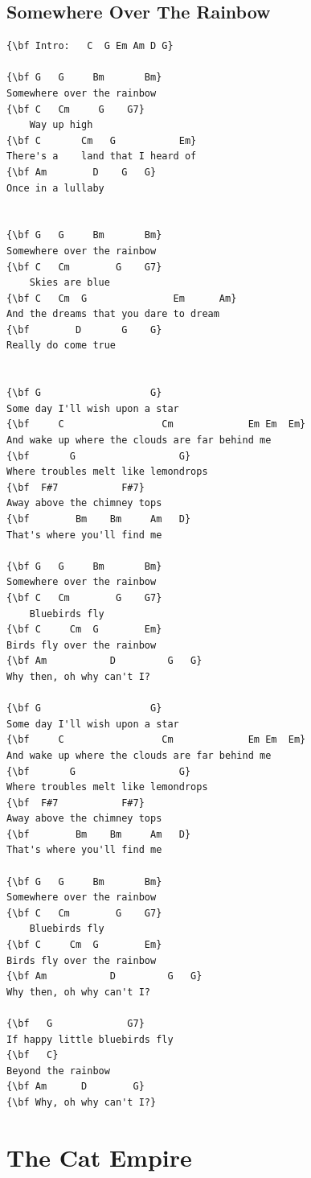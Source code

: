 \documentclass[a4paper]{article}
\begin{document}
\subsection{Somewhere Over The Rainbow}
\begin{Verbatim}[commandchars=\\\{\}]
{\bf Intro:   C  G Em Am D G}

{\bf G   G     Bm       Bm}
Somewhere over the rainbow
{\bf C   Cm     G    G7}
    Way up high
{\bf C       Cm   G           Em}
There's a    land that I heard of
{\bf Am        D    G   G}
Once in a lullaby


{\bf G   G     Bm       Bm}
Somewhere over the rainbow
{\bf C   Cm        G    G7}
    Skies are blue
{\bf C   Cm  G               Em      Am}
And the dreams that you dare to dream
{\bf        D       G    G}
Really do come true


{\bf G                   G}
Some day I'll wish upon a star
{\bf     C                 Cm             Em Em  Em}
And wake up where the clouds are far behind me
{\bf       G                  G}
Where troubles melt like lemondrops
{\bf  F#7           F#7}
Away above the chimney tops
{\bf        Bm    Bm     Am   D}
That's where you'll find me

{\bf G   G     Bm       Bm}
Somewhere over the rainbow
{\bf C   Cm        G    G7}
    Bluebirds fly
{\bf C     Cm  G        Em}
Birds fly over the rainbow
{\bf Am           D         G   G}
Why then, oh why can't I?

{\bf G                   G}
Some day I'll wish upon a star
{\bf     C                 Cm             Em Em  Em}
And wake up where the clouds are far behind me
{\bf       G                  G}
Where troubles melt like lemondrops
{\bf  F#7           F#7}
Away above the chimney tops
{\bf        Bm    Bm     Am   D}
That's where you'll find me

{\bf G   G     Bm       Bm}
Somewhere over the rainbow
{\bf C   Cm        G    G7}
    Bluebirds fly
{\bf C     Cm  G        Em}
Birds fly over the rainbow
{\bf Am           D         G   G}
Why then, oh why can't I?

{\bf   G             G7}
If happy little bluebirds fly
{\bf   C}
Beyond the rainbow
{\bf Am      D        G}
{\bf Why, oh why can't I?}

\end{Verbatim}
\newpage
\section{The Cat Empire}
\end{document}
